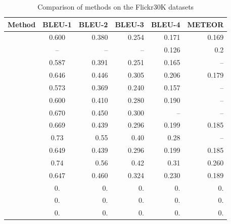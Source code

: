 \begin{table}[ht]
\caption{Comparison of methods on the Flickr30K datasets}
\begin{tabular}{lcrrrr}
    \toprule
    Method &  BLEU-1 & BLEU-2 & BLEU-3 & BLEU-4 & METEOR\\
    \midrule
    \citet{Kiros2014a}      & 0.600 & 0.380 & 0.254 & 0.171 & 0.169 \\
    \citet{Chen2015}        & --    & --    & --    & 0.126  & 0.2 \\
    \citet{Donahue2015}     & 0.587 & 0.391 & 0.251 & 0.165 & -- \\
    \citet{Jia2015}         & 0.646 & 0.446 & 0.305 & 0.206 & 0.179 \\
    \citet{Karpathy2015}    & 0.573 & 0.369 & 0.240 & 0.157 & -- \\
    \citet{Mao2015_mRNN}        & 0.600 & 0.410 & 0.280 & 0.190 & -- \\
    \citet{Vinyals2015}     & 0.670 & 0.450 & 0.300 & --    & -- \\
    \citet{Xu2015}          & 0.669 & 0.439 & 0.296 & 0.199 & 0.185 \\    
    \citet{Wu2016}          & 0.73  & 0.55  & 0.40  & 0.28  & -- \\
    \citet{Fu2017}          & 0.649 & 0.439 & 0.296 & 0.199 & 0.185 \\
    \citet{Wu2018}          & 0.74  & 0.56  & 0.42  & 0.31  & 0.260 \\
    \citet{You2016}         & 0.647 & 0.460 & 0.324 & 0.230 & 0.189 \\    
    \citet{} & 0. & 0. & 0. & 0. & 0. \\
    \citet{} & 0. & 0. & 0. & 0. & 0. \\
    \citet{} & 0. & 0. & 0. & 0. & 0. \\
    \bottomrule
\end{tabular}
\label{tab:benchmarks_flickr30k}
\end{table}

